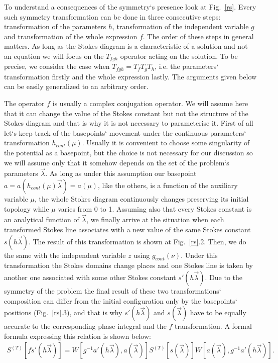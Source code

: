 \documentclass[aps,prl,preprint,superscriptaddress]{revtex4}
\begin{document}
To understand a consequences of the symmetry`s presence look at Fig.~\ref{rs}. Every such symmetry transformation can be done in three consecutive steps: transformation of the parameters $h$, transformation of the independent variable $g$ and transformation of the whole expression $f$.   The order of these steps in general matters. As long as the Stokes diagram is a characteristic of a solution and not an equation we will focus on the $T_{fgh}$ operator acting on the solution. To be precise, we consider the case when $T_{fgh}=T_f T_g T_h$, i.e. the parameters` transformation firstly and the whole expression lastly. The arguments given below can be easily generalized to an arbitrary order.

The operator $f$ is usually a complex conjugation operator. We will assume here that it can change the value of the Stokes constant but not the structure of the Stokes diagram and that is why it is not necessary to parameterise it. First of all let`s keep track of the basepoints` movement under the continuous parameters` transformation $h_{cont}(\mu)$. Usually it is convenient to choose some singularity of the potential as a basepoint, but the choice is not necessary for our discussion so we will assume only that it somehow depends on the set of the problem`s parameters $\vec{\lambda}$. As long as under this assumption our basepoint $a=a(h_{cont}(\mu)\vec{\lambda})=a(\mu)$, like the others, is a function of the auxiliary variable $\mu$, the whole Stokes diagram continuously changes preserving its initial topology while  $\mu$ varies from 0 to 1. Assuming also that every Stokes constant is an analytical function of $\vec{\lambda}$, we finally arrive at the situation when each transformed Stokes line associates with a new value of the same Stokes constant $s(h\vec{\lambda})$. The result of this transformation is shown at Fig.~\ref{rs}.2. Then, we do the same with the independent variable $z$ using $g_{cont}(\nu)$. Under this transformation the Stokes domains change places and one Stokes line is taken by another one associated with some other Stokes constant $s'(h\vec{\lambda})$. Due to the symmetry of the problem the final result of these two transformations` composition can differ from the initial configuration only by the basepoints` positions (Fig.~\ref{rs}.3), and that is why $s'(h\vec{\lambda})$ and $s(\vec{\lambda})$ have to be equally accurate to the corresponding phase integral and the $f$ transformation. A formal formula expressing this relation is shown below:
\begin{eqnarray}
S^{(T)}[f s'(h\vec{\lambda})] = 
W[g^{-1}a'(h\vec{\lambda}),a(\vec{\lambda})]S^{(T)}[s(\vec{\lambda})]W[a(\vec{\lambda}),g^{-1}a'(h\vec{\lambda})].
\label{gensym}
\end{eqnarray}
\end{document}
